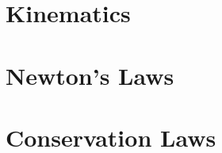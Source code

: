\documentclass[english,twoside]{labmanual} %
\begin{document}


\setcounter{tocdepth}{1}\tableofcontents{}

\part{Kinematics}


%
%

%
%
%



%


%

%
%
%
%
%
%
%

\part{Newton's Laws}


%
%
%

%



%
%

\part{Conservation Laws}




%
%
%
%
%
%


%
%
%
%
%
%
%
\end{document}
